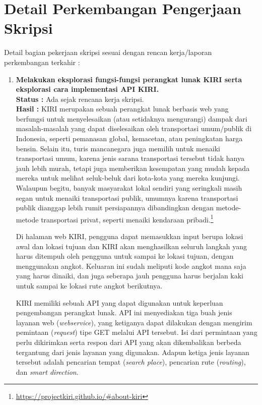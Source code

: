 \documentclass[a4paper,twoside]{article}
\begin{document}
\section{Detail Perkembangan Pengerjaan Skripsi}
\label{sec:devdetail}
Detail bagian pekerjaan skripsi sesuai dengan rencan kerja/laporan perkembangan terkahir :
	\begin{enumerate}
		\item \textbf{Melakukan eksplorasi fungsi-fungsi perangkat lunak KIRI serta eksplorasi cara \mbox{implementasi} API KIRI.}\\
		{\bf Status :} Ada sejak rencana kerja skripsi.\\
		{\bf Hasil :} KIRI merupakan sebuah perangkat lunak berbasis web yang berfungsi untuk menyelesaikan (atau setidaknya mengurangi) dampak dari masalah-masalah yang dapat diselesaikan oleh \mbox{transportasi} umum/publik di Indonesia, seperti pemanasan global, kemacetan, atau peningkatan harga bensin. \mbox{Selain} itu, turis mancanegara juga memilih untuk menaiki transportasi umum, karena jenis \mbox{sarana} transportasi tersebut tidak hanya jauh lebih murah, tetapi juga memberikan kesempatan yang \mbox{mudah} kepada mereka untuk melihat seluk-beluk dari kota-kota yang mereka kunjungi. Walaupun \mbox{begitu}, \mbox{banyak} masyarakat lokal sendiri yang seringkali masih segan untuk menaiki transportasi publik, umumnya karena transportasi publik dianggap lebih rumit persiapannya dibandingkan dengan metode-metode transportasi privat, seperti menaiki kendaraan pribadi.\footnote{\href{https://projectkiri.github.io/\#about-kiri}{https://projectkiri.github.io/\#about-kiri}}

Di halaman web KIRI, pengguna dapat memasukkan input berupa lokasi awal dan lokasi tujuan dan KIRI akan menghasilkan seluruh langkah yang harus ditempuh oleh pengguna untuk sampai ke lokasi tujuan, dengan menggunakan angkot. Keluaran ini sudah meliputi kode angkot mana saja yang harus dinaiki, dan juga seberapa jauh pengguna harus berjalan kaki untuk sampai ke lokasi rute angkot berikutnya.

KIRI memiliki sebuah API yang dapat digunakan untuk keperluan pengembangan perangkat \mbox{lunak}. API ini menyediakan tiga buah jenis layanan web (\textit{webservice}), yang ketiganya dapat dilakukan \mbox{dengan} mengirim pemintaan (\textit{request}) tipe GET melalui API tersebut. Isi dari permintaan yang perlu \mbox{dikirimkan} serta respon dari API yang akan dikembalikan berbeda tergantung dari jenis layanan yang digunakan. Adapun ketiga jenis layanan tersebut adalah pencarian tempat (\textit{search place}), pencarian rute (\textit{routing}), dan \textit{smart direction}.


\end{enumerate}
\end{document}
